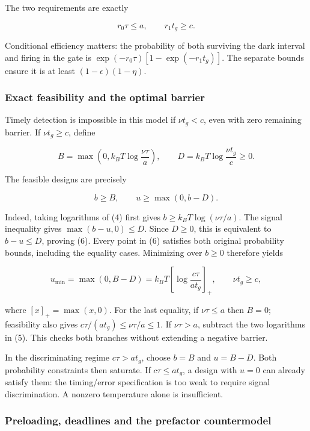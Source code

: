 \documentclass[11pt,a4paper]{article}
\begin{document}
The two requirements are exactly

\[r_0\tau\le a,\qquad r_1t_g\ge c. \tag{4}\]

Conditional efficiency matters: the probability of both surviving the
dark interval and firing in the gate is
\(\exp(-r_0\tau)[1-\exp(-r_1t_g)]\). The separate bounds ensure it is at
least \((1-\epsilon)(1-\eta)\).

\hypertarget{exact-feasibility-and-the-optimal-barrier}{%
\subsubsection{Exact feasibility and the optimal
barrier}\label{exact-feasibility-and-the-optimal-barrier}}

Timely detection is impossible in this model if \(\nu t_g<c\), even with
zero remaining barrier. If \(\nu t_g\ge c\), define

\[B=\max\!\left(0,k_BT\log\frac{\nu\tau}{a}\right),\qquad
D=k_BT\log\frac{\nu t_g}{c}\ge0. \tag{5}\]

The feasible designs are precisely

\[b\ge B,\qquad u\ge\max(0,b-D). \tag{6}\]

Indeed, taking logarithms of (4) first gives
\(b\ge k_BT\log(\nu\tau/a)\). The signal inequality gives
\(\max(b-u,0)\le D\). Since \(D\ge0\), this is equivalent to
\(b-u\le D\), proving (6). Every point in (6) satisfies both original
probability bounds, including the equality cases. Minimizing over
\(b\ge0\) therefore yields

\[u_{\min}=\max(0,B-D)
 =k_BT\left[\log\frac{c\tau}{a t_g}\right]_+,
 \qquad \nu t_g\ge c, \tag{7}\]

where \([x]_+=\max(x,0)\). For the last equality, if \(\nu\tau\le a\)
then \(B=0\); feasibility also gives \(c\tau/(at_g)\le\nu\tau/a\le1\).
If \(\nu\tau>a\), subtract the two logarithms in (5). This checks both
branches without extending a negative barrier.

In the discriminating regime \(c\tau>at_g\), choose \(b=B\) and
\(u=B-D\). Both probability constraints then saturate. If
\(c\tau\le at_g\), a design with \(u=0\) can already satisfy them: the
timing/error specification is too weak to require signal discrimination.
A nonzero temperature alone is insufficient.

\hypertarget{preloading-deadlines-and-the-prefactor-countermodel}{%
\subsubsection{Preloading, deadlines and the prefactor
countermodel}\label{preloading-deadlines-and-the-prefactor-countermodel}}
\end{document}
